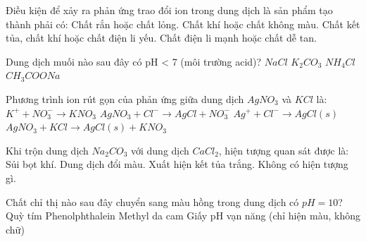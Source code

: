 \begin{ex}
	Điều kiện để xảy ra phản ứng trao đổi ion trong dung dịch là sản phẩm tạo thành phải có:
	\choice
	{Chất rắn hoặc chất lỏng.}
	{Chất khí hoặc chất không màu.}
	{\True Chất kết tủa, chất khí hoặc chất điện li yếu.}
	{Chất điện li mạnh hoặc chất dễ tan.}
\end{ex}
\begin{ex}
	Dung dịch muối nào sau đây có pH < 7 (môi trường acid)?
	\choice
	{$NaCl$}
	{$K_2CO_3$}
	{\True $NH_4Cl$}
	{$CH_3COONa$}
\end{ex}
\begin{ex}
	Phương trình ion rút gọn của phản ứng giữa dung dịch $AgNO_3$ và $KCl$ là:
	\choice
	{$K^+ + NO_3^- \rightarrow KNO_3$}
	{$AgNO_3 + Cl^- \rightarrow AgCl + NO_3^-$}
	{\True $Ag^+ + Cl^- \rightarrow AgCl(s)$}
	{$AgNO_3 + KCl \rightarrow AgCl(s) + KNO_3$}
\end{ex}
\begin{ex}
	Khi trộn dung dịch $Na_2CO_3$ với dung dịch $CaCl_2$, hiện tượng quan sát được là:
	\choice
	{Sủi bọt khí.}
	{Dung dịch đổi màu.}
	{\True Xuất hiện kết tủa trắng.}
	{Không có hiện tượng gì.}
\end{ex}
\begin{ex}
	Chất chỉ thị nào sau đây chuyển sang màu hồng trong dung dịch có $pH = 10$?
	\choice
	{Quỳ tím}
	{\True Phenolphthalein}
	{Methyl da cam}
	{Giấy pH vạn năng (chỉ hiện màu, không chữ)}
\end{ex}
